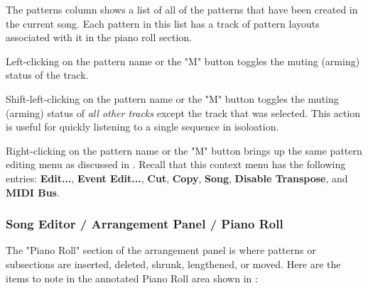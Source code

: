    The patterns column shows a list of all of the patterns that have been
   created in the current song.  Each pattern in this list has a track of
   pattern layouts associated with it in the piano roll section.

   Left-clicking on the pattern name or the "M" button toggles the muting
   (arming) status of the track.

   Shift-left-clicking on the pattern name or the "M" button toggles the muting
   (arming) status of \textsl{all other tracks} except the track that was
   selected.  This action is useful for quickly listening to a single sequence
   in isoloation.

   Right-clicking on the pattern name or the "M" button brings up the same
   pattern editing menu as discussed in
   .
   Recall that this context menu has the following entries:
   \textbf{Edit...}, \textbf{Event Edit...}, \textbf{Cut}, \textbf{Copy},
   \textbf{Song}, \textbf{Disable Transpose}, and \textbf{MIDI Bus}.

\subsubsection{Song Editor / Arrangement Panel / Piano Roll}
\label{subsubsec:seq64_song_editor_arrangement_panel_roll}

   The "Piano Roll" section of the arrangement panel is where patterns or
   subsections are inserted, deleted, shrunk, lengthened, or moved.
   Here are the items to note in the annotated Piano Roll area
   shown in :

